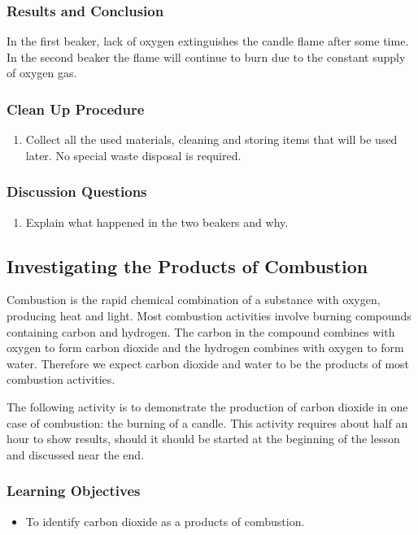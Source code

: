 \subsubsection*{Results and Conclusion}
In the first beaker, lack of oxygen extinguishes the candle flame after some time. In the second beaker the flame will continue to burn due to the constant supply of oxygen gas. 

\subsubsection*{Clean Up Procedure}
\begin{enumerate}
\item{Collect all the used materials, cleaning and storing items that will be used later. No special waste disposal is required.}
\end{enumerate}

\subsubsection*{Discussion Questions}
\begin{enumerate}
\item{Explain what happened in the two beakers and why.}
\end{enumerate}


\subsection{Investigating the Products of Combustion}

Combustion is the rapid chemical combination of a substance with oxygen, producing heat and light. Most combustion activities involve burning compounds containing carbon and hydrogen. The carbon in the compound combines with oxygen to form carbon dioxide and the hydrogen combines with oxygen to form water. Therefore we expect carbon dioxide and water to be the products of most combustion activities.

The following activity is to demonstrate the production of carbon dioxide in one case of combustion: the burning of a candle. This activity requires about half an hour to show results, should it should be started at the beginning of the lesson and discussed near the end.

\subsubsection*{Learning Objectives}
\begin{itemize}
\item{To identify carbon dioxide as a products of combustion.}
\end{itemize}

